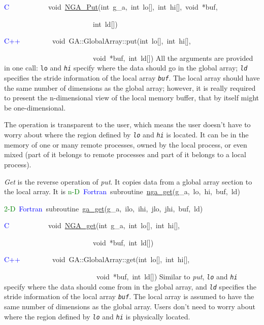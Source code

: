 \textcolor{blue}{C}~~~~~~~~~~~void~\href{https://hpc.pnl.gov/globalarrays/api/c_op_api.html\#PUT}{NGA\_{}Put}(int~g\_a,~int~lo{[}{]},~int~hi{[}{]},~void~{*}buf,~

~~~~~~~~~~~~~~~~~~~~~~~~~int~ld{[}{]})~

\textcolor{blue}{C++}~~~~~~~~~void~GA::GlobalArray::put(int~lo{[}{]},~int~hi{[}{]},~

~~~~~~~~~~~~~~~~~~~~~~~~~void~{*}buf,~int~ld{[}{]})
All the arguments are provided in one call: \texttt{lo} and \texttt{\emph{hi}}
specify where the data should go in the global array; \texttt{\emph{ld}}
specifies the stride information of the local array \texttt{\emph{buf}}.
The local array should have the same number of dimensions as the global
array; however, it is really required to present the n-dimensional
view of the local memory buffer, that by itself might be one-dimensional.

The operation is transparent to the user, which means the user doesn't
have to worry about where the region defined by \texttt{\emph{lo}}
and \texttt{\emph{hi}} is located. It can be in the memory of one
or many remote processes, owned by the local process, or even mixed
(part of it belongs to remote processes and part of it belongs to
a local process).

\emph{Get} is the reverse operation of \emph{put}. It copies data
from a global array section to the local array. It is
\textcolor{green}{n-D}~\textcolor{blue}{Fortran}~subroutine~\href{http://www.emsl.pnl.gov/docs/global/ga_ops.html\#ga_get}{nga\_{}get}(g\_a,~lo,~hi,~buf,~ld)~

\textcolor{green}{2-D}~\textcolor{blue}{Fortran}~subroutine~\href{http://www.emsl.pnl.gov/docs/global/ga_ops.html\#ga_get}{ga\_{}get}(g\_a,~ilo,~ihi,~jlo,~jhi,~buf,~ld)~

\textcolor{blue}{C}~~~~~~~~~~~void~\href{http://www.emsl.pnl.gov/docs/global/c_nga_ops.html\#ga_get}{NGA\_{}get}(int~g\_a,~int~lo{[}{]},~int~hi{[}{]},~

~~~~~~~~~~~~~~~~~~~~~~~~~void~{*}buf,~int~ld{[}{]})~

\textcolor{blue}{C++}~~~~~~~~~void~GA::GlobalArray::get(int~lo{[}{]},~int~hi{[}{]},~

~~~~~~~~~~~~~~~~~~~~~~~~~~void~{*}buf,~int~ld{[}{]})
Similar to \emph{put}, \texttt{\emph{lo}} and \texttt{\emph{hi}} specify
where the data should come from in the global array, and \texttt{\emph{ld}}
specifies the stride information of the local array \texttt{\emph{buf}}.
The local array is assumed to have the same number of dimensions as
the global array. Users don't need to worry about where the region
defined by \texttt{\emph{lo}} and \texttt{\emph{hi}} is physically
located.

